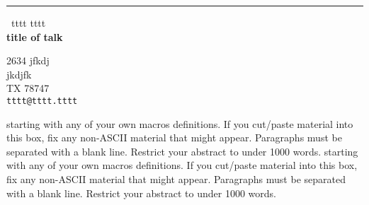 \documentclass{report}
\begin{document}
\begin{center}
\rule{6in}{1pt} \
{\large tttt tttt \\
{\bf title of talk}}

2634 jfkdj \\ jkdjfk \\ TX 78747
\\
{\tt tttt@tttt.tttt}\end{center}

starting with any of your own macros definitions.
If you cut/paste material into this box, fix any non-ASCII material that might appear.
Paragraphs must be separated with a blank line.
Restrict your abstract to under 1000 words.
starting with any of your own macros definitions.
If you cut/paste material into this box, fix any non-ASCII material that might appear.
Paragraphs must be separated with a blank line.
Restrict your abstract to under 1000 words.
\end{document}

